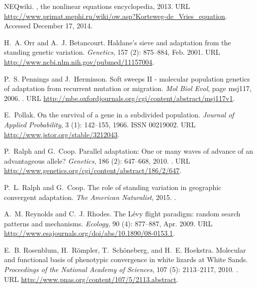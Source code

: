\documentclass[10pt,letterpaper]{article}
\begin{document}
\begin{thebibliography}{68}
NEQwiki.
, the nonlinear equations encyclopedia, 2013.
\newblock URL
  \url{http://www.primat.mephi.ru/wiki/ow.asp?Korteweg-de_Vries_equation}.
\newblock Accessed December 17, 2014.

H.~A. Orr and A.~J. Betancourt.
\newblock Haldane's sieve and adaptation from the standing genetic variation.
\newblock \emph{Genetics}, 157 (2): 875--884, Feb. 2001.
\newblock URL \url{http://www.ncbi.nlm.nih.gov/pubmed/11157004}.

P.~S. Pennings and J.~Hermisson.
\newblock Soft sweeps {II} - molecular population genetics of adaptation from
  recurrent mutation or migration.
\newblock \emph{Mol Biol Evol}, page msj117, 2006.
\newblock {}.
\newblock URL
  \url{http://mbe.oxfordjournals.org/cgi/content/abstract/msj117v1}.

E.~Pollak.
\newblock On the survival of a gene in a subdivided population.
\newblock \emph{Journal of Applied Probability}, 3 (1):
  142--155, 1966.
\newblock ISSN 00219002.
\newblock URL \url{http://www.jstor.org/stable/3212043}.

P.~Ralph and G.~Coop.
\newblock Parallel adaptation: One or many waves of advance of an advantageous
  allele?
\newblock \emph{Genetics}, 186 (2): 647--668, 2010.
\newblock {}.
\newblock URL \url{http://www.genetics.org/cgi/content/abstract/186/2/647}.

P.~L. Ralph and G.~Coop.
\newblock The role of standing variation in geographic convergent adaptation.
\newblock \emph{The American Naturalist}, 2015.
\newblock {}.

A.~M. Reynolds and C.~J. Rhodes.
\newblock The {L{é}vy} flight paradigm: random search patterns and mechanisms.
\newblock \emph{Ecology}, 90 (4): 877--887, Apr. 2009.
\newblock URL \url{http://www.esajournals.org/doi/abs/10.1890/08-0153.1}.

E.~B. Rosenblum, H.~Römpler, T.~Schöneberg, and H.~E. Hoekstra.
\newblock Molecular and functional basis of phenotypic convergence in white
  lizards at {W}hite {S}ands.
\newblock \emph{Proceedings of the National Academy of Sciences}, 107
  (5): 2113--2117, 2010.
\newblock {}.
\newblock URL \url{http://www.pnas.org/content/107/5/2113.abstract}.


\end{thebibliography}
\end{document}
